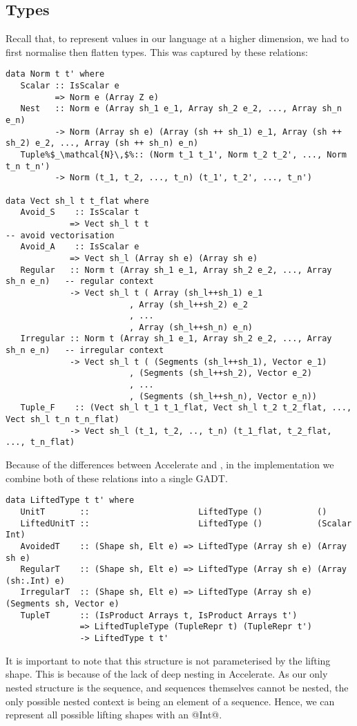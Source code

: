 \subsection{Types}
Recall that, to represent values in our language at a higher dimension, we had to first normalise then flatten types. This was captured by these relations:
%
\begin{lstlisting}[style=ndp]
data Norm t t' where
   Scalar :: IsScalar e
          => Norm e (Array Z e)
   Nest   :: Norm e (Array sh_1 e_1, Array sh_2 e_2, ..., Array sh_n e_n)
          -> Norm (Array sh e) (Array (sh ++ sh_1) e_1, Array (sh ++ sh_2) e_2, ..., Array (sh ++ sh_n) e_n)
   Tuple%$_\mathcal{N}\,$%:: (Norm t_1 t_1', Norm t_2 t_2', ..., Norm t_n t_n')
          -> Norm (t_1, t_2, ..., t_n) (t_1', t_2', ..., t_n')

data Vect sh_l t t_flat where
   Avoid_S    :: IsScalar t
             => Vect sh_l t t                                             -- avoid vectorisation
   Avoid_A    :: IsScalar e
             => Vect sh_l (Array sh e) (Array sh e)
   Regular   :: Norm t (Array sh_1 e_1, Array sh_2 e_2, ..., Array sh_n e_n)   -- regular context
             -> Vect sh_l t ( Array (sh_l++sh_1) e_1
                         , Array (sh_l++sh_2) e_2
                         , ...
                         , Array (sh_l++sh_n) e_n)
   Irregular :: Norm t (Array sh_1 e_1, Array sh_2 e_2, ..., Array sh_n e_n)   -- irregular context
             -> Vect sh_l t ( (Segments (sh_l++sh_1), Vector e_1)
                         , (Segments (sh_l++sh_2), Vector e_2)
                         , ...
                         , (Segments (sh_l++sh_n), Vector e_n))
   Tuple_F    :: (Vect sh_l t_1 t_1_flat, Vect sh_l t_2 t_2_flat, ..., Vect sh_l t_n t_n_flat)
             -> Vect sh_l (t_1, t_2, .., t_n) (t_1_flat, t_2_flat, ..., t_n_flat)
\end{lstlisting}
%
Because of the differences between Accelerate and \ndp{}, in the implementation we combine both of these relations into a single GADT.
%
\begin{lstlisting}
data LiftedType t t' where
   UnitT       ::                      LiftedType ()           ()
   LiftedUnitT ::                      LiftedType ()           (Scalar Int)
   AvoidedT    :: (Shape sh, Elt e) => LiftedType (Array sh e) (Array sh e)
   RegularT    :: (Shape sh, Elt e) => LiftedType (Array sh e) (Array (sh:.Int) e)
   IrregularT  :: (Shape sh, Elt e) => LiftedType (Array sh e) (Segments sh, Vector e)
   TupleT      :: (IsProduct Arrays t, IsProduct Arrays t')
               => LiftedTupleType (TupleRepr t) (TupleRepr t')
               -> LiftedType t t'
\end{lstlisting}
%
It is important to note that this structure is not parameterised by the lifting shape. This is because of the lack of deep nesting in Accelerate. As our only nested structure is the sequence, and sequences themselves cannot be nested, the only possible nested context is being an element of a sequence. Hence, we can represent all possible lifting shapes with an @Int@.

